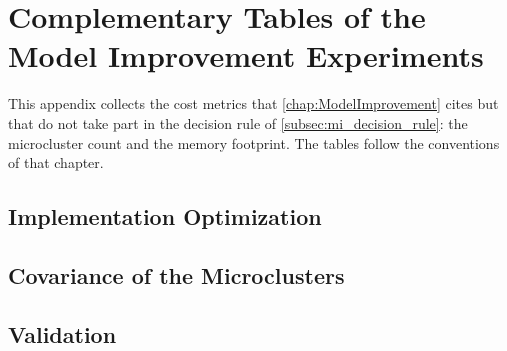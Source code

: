 \chapter{Complementary Tables of the Model Improvement Experiments}
\label{app:mi_tables}

This appendix collects the cost metrics that \cref{chap:ModelImprovement} cites but that do not take part in the decision rule of \cref{subsec:mi_decision_rule}: the microcluster count and the memory footprint. The tables follow the conventions of that chapter.

\section{Implementation Optimization}



\section{Covariance of the Microclusters}



\section{Validation}


\clearpage
